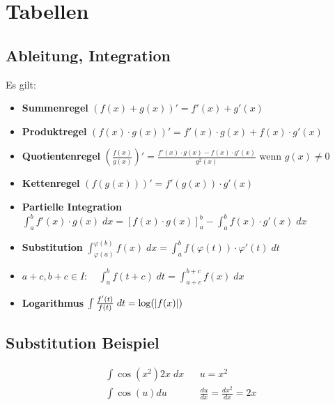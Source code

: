
\section{Tabellen}
\subsection*{Ableitung, Integration}
Es gilt:
\begin{itemize}
  \item \textbf{Summenregel} $ (f (x) + g (x))' = f' (x) + g' (x)$
  \item \textbf{Produktregel} $ (f (x) \cdot g (x))' = f' (x) \cdot g (x) + f (x) \cdot g' (x)$
  \item \textbf{Quotientenregel} $\left( \frac{f (x)}{g (x)} \right)' = \frac{f' (x) \cdot g (x) - f (x) \cdot g' (x)}{g^2 (x)}$ wenn $g (x) \neq 0$
  \item \textbf{Kettenregel} $ (f (g (x)))' = f' (g (x)) \cdot g' (x)$
  \item \textbf{Partielle Integration} $\int_a^b f' (x) \cdot g (x) \; dx = [f (x) \cdot g (x)]_a^b - \int_a^b f (x) \cdot g' (x) \; dx$
  \item \textbf{Substitution} $\int_{\varphi (a)}^{\varphi (b)} f (x) \; dx = \int_a^b f (\varphi (t)) \cdot \varphi' (t) \; dt$
  \item $a+c, b+c \in I: \quad \int_a^b f (t + c) \; dt = \int_{a+c}^{b+c} f (x) \; dx$
  \item \textbf{Logarithmus} $\int \frac{f' (t)}{f (t)} \; dt = \log (\abs{f (x)})$
\end{itemize}
\subsection*{Substitution Beispiel}
\begin{align*}
  \int \cos (x^2) 2x \; dx &  & u = x^2                              \\
  \int \cos (u) du         &  & \frac{du}{dx} = \frac{dx^2}{dx} = 2x
\end{align*}
